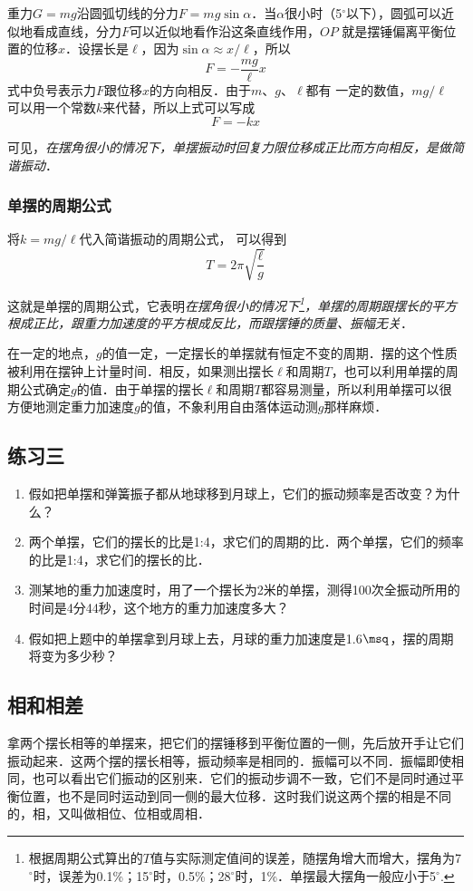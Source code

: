 重力$G=mg$沿圆弧切线的分力$F=mg\sin\alpha$．当$\alpha$很小时（5$^\circ$以下），圆弧可以近似地看成直线，分力$F$可以近似地看作沿这条直线作用，$OP$ 就是摆锤偏离平衡位置的位移$x$．设摆长是$\ell$，因为$\sin\alpha\approx x/\ell$，所以
\[F=-\frac{mg}{\ell}x\]
式中负号表示力$F$跟位移$x$的方向相反．由于$m$、$g$、$\ell$都有
一定的数值，$mg/\ell$
可以用一个常数$k$来代替，所以上式可以写成
\[F=-kx\]

可见，\textit{在摆角很小的情况下，单摆振动时回复力限位移成正比而方向相反，是做简谐振动}．

\subsubsection{单摆的周期公式}

将$k=mg/\ell$代入简谐振动的周期公式，
可以得到
\[T=2\pi\sqrt{\frac{\ell}{g}}\]

这就是单摆的周期公式，它表明\textit{在摆角很小的情况下\footnote{根据周期公式算出的$T$值与实际测定值间的误差，随摆角增大而增大，摆角为7$^\circ$时，误差为0.1\%；15$^\circ$时，0.5\%；28$^\circ$时，1\%．单摆最大摆角一般应小于5$^\circ$.}，单摆的周期跟摆长的平方根成正比，跟重力加速度的平方根成反比，而跟摆锤的质量、振幅无关}．

在一定的地点，$g$的值一定，一定摆长的单摆就有恒定不变的周期．摆的这个性质被利用在摆钟上计量时间．相反，如果测出摆长$\ell$和周期$T$，也可以利用单摆的周期公式确定$g$的值．由于单摆的摆长$\ell$和周期$T$都容易测量，所以利用单摆可以很方便地测定重力加速度$g$的值，不象利用自由落体运动测$g$那样麻烦．

\subsection*{练习三}
\begin{enumerate}
    \item 假如把单摆和弹簧振子都从地球移到月球上，它们的振动频率是否改变？为什么？
    \item 两个单摆，它们的摆长的比是1:4，求它们的周期的比．两个单摆，它们的频率的比是1:4，求它们的摆长的比．
    \item 测某地的重力加速度时，用了一个摆长为2米的单摆，测得100次全振动所用的时间是4分44秒，这个地方的重力加速度多大？
    \item 假如把上题中的单摆拿到月球上去，月球的重力加速度是1.6$\msq$，摆的周期将变为多少秒？
\end{enumerate}

\subsection{相和相差}
拿两个摆长相等的单摆来，把它们的摆锤移到平衡位置的一侧，先后放开手让它们振动起来．这两个摆的摆长相等，振动频率是相同的．振幅可以不同．振幅即使相同，也可以看出它们振动的区别来．它们的振动步调不一致，它们不是同时通过平衡位置，也不是同时运动到同一侧的最大位移．这时我们说这两个摆的相是不同的，相，又叫做相位、位相或周相．

